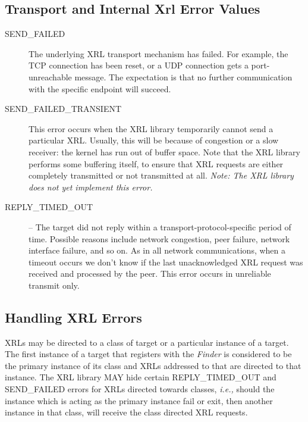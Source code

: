 \documentclass[11pt]{article}
\makeatletter
\newcommand{\ie}{\emph{i.e.,}\xspace}
\newcommand{\finder} {{\em Finder}\@\xspace}
\makeatother
\begin{document}
\subsection*{Transport and Internal Xrl Error Values}

\begin{description}

  \item [SEND\_FAILED] The underlying XRL transport mechanism has failed.
  For example, the TCP connection has been reset, or a UDP connection
  gets a port-unreachable message. The expectation is that no further
  communication with the specific endpoint will succeed.

  \item [SEND\_FAILED\_TRANSIENT] This error occurs when the XRL library
  temporarily cannot send a particular XRL. Usually, this will be
  because of congestion or a slow receiver: the kernel has run out of
  buffer space. Note that the XRL library performs some buffering
  itself, to ensure that XRL requests are either completely transmitted
  or not transmitted at all.
  \emph{Note: The XRL library does not yet implement this error.}

  \item [REPLY\_TIMED\_OUT] -- The target did not reply within a
  transport-protocol-specific period of time. Possible reasons include
  network congestion, peer failure, network interface failure, and so
  on. As in all network communications, when a timeout occurs we don't
  know if the last unacknowledged XRL request was received and processed
  by the peer. This error occurs in unreliable transmit only.

\end{description}

\subsection{Handling XRL Errors}

XRLs may be directed to a class of target or a particular instance of
a target.  The first instance of a target that registers with the
\finder is considered to be the primary instance of its class and XRLs
addressed to that are directed to that instance.  The XRL library MAY
hide certain REPLY\_TIMED\_OUT and SEND\_FAILED errors for XRLs
directed towards classes, \ie should the instance which is acting as
the primary instance fail or exit, then another instance in that
class, will receive the class directed XRL requests.
\end{document}
